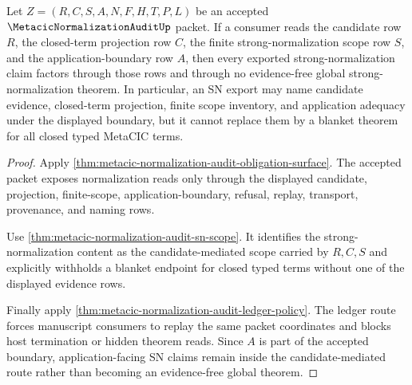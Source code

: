 \begin{theorem}
\label{thm:metacic-normalization-audit-candidate-mediated-sn-closure}
Let $Z=(R,C,S,A,N,F,H,T,P,L)$ be an accepted $\MetacicNormalizationAuditUp$ packet. If a consumer reads the candidate row $R$, the closed-term projection row $C$, the finite strong-normalization scope row $S$, and the application-boundary row $A$, then every exported strong-normalization claim factors through those rows and through no evidence-free global strong-normalization theorem. In particular, an SN export may name candidate evidence, closed-term projection, finite scope inventory, and application adequacy under the displayed boundary, but it cannot replace them by a blanket theorem for all closed typed MetaCIC terms.
\end{theorem}
\begin{proof}
Apply \autoref{thm:metacic-normalization-audit-obligation-surface}. The accepted packet exposes normalization reads only through the displayed candidate, projection, finite-scope, application-boundary, refusal, replay, transport, provenance, and naming rows.

Use \autoref{thm:metacic-normalization-audit-sn-scope}. It identifies the strong-normalization content as the candidate-mediated scope carried by $R,C,S$ and explicitly withholds a blanket endpoint for closed typed terms without one of the displayed evidence rows.

Finally apply \autoref{thm:metacic-normalization-audit-ledger-policy}. The ledger route forces manuscript consumers to replay the same packet coordinates and blocks host termination or hidden theorem reads. Since $A$ is part of the accepted boundary, application-facing SN claims remain inside the candidate-mediated route rather than becoming an evidence-free global theorem.
\end{proof}

